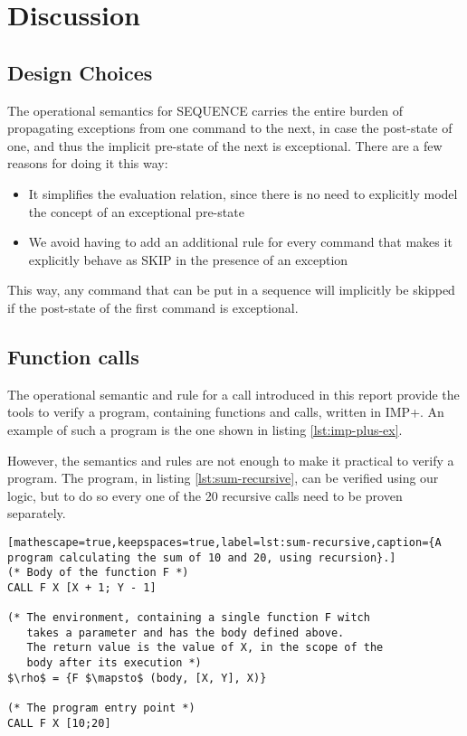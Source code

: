 \section{Discussion}

\subsection{Design Choices}
The operational semantics for SEQUENCE carries the entire burden of propagating exceptions from one command to the next, in case the post-state of one, and thus the implicit pre-state of the next is exceptional. There are a few reasons for doing it this way:

\begin{itemize}
\item It simplifies the evaluation relation, since there is no need to explicitly model the concept of an exceptional pre-state
\item We avoid having to add an additional rule for every command that makes it explicitly behave as SKIP in the presence of an exception
\end{itemize}

This way, any command that can be put in a sequence will implicitly be skipped if the post-state of the first command is exceptional.

\subsection{Function calls}
The operational semantic and rule for a call introduced in this report provide the tools to verify a program, containing functions and calls, written in IMP+. An example of such a program is the one shown in listing \ref{lst:imp-plus-ex}.

However, the semantics and rules are not enough to make it practical to verify a program. The program, in listing \ref{lst:sum-recursive}, can be verified using our logic, but to do so every one of the 20 recursive calls need to be proven separately.

\begin{lstlisting}[mathescape=true,keepspaces=true,label=lst:sum-recursive,caption={A program calculating the sum of 10 and 20, using recursion}.]
(* Body of the function F *)
CALL F X [X + 1; Y - 1]

(* The environment, containing a single function F witch
   takes a parameter and has the body defined above.
   The return value is the value of X, in the scope of the 
   body after its execution *)
$\rho$ = {F $\mapsto$ (body, [X, Y], X)}

(* The program entry point *)
CALL F X [10;20]
\end{lstlisting}

